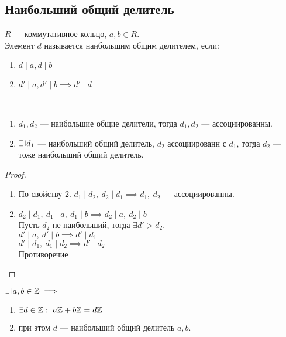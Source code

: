 \begin{normalsize}

\section{Наибольший общий делитель}

\begin{defn}
    $R$ --- коммутативное кольцо, $a, b \in R$.\\
    Элемент $d$ называется наибольшим общим делителем, если:\\
    \begin{enumerate}
        \item $d \mid a, d \mid b$
        \item $d' \mid a, d' \mid b \implies d' \mid d$
    \end{enumerate}
\end{defn}

\begin{theorem-non}~
    \begin{enumerate}
        \item $d_1, d_2$ --- наибольшие общие делители, тогда $d_1, d_2$ --- ассоциированны.
        \item $\letus d_1$ --- наибольший общий делитель, $d_2$ ассоциированн с $d_1$, тогда $d_2$ --- тоже наибольший общий делитель.
    \end{enumerate}
\end{theorem-non}

\begin{proof}
    \begin{enumerate}
        \item По свойству 2. $d_1 \mid d_2,~d_2 \mid d_1 \implies d_1,~d_2$ --- ассоциированны.
        \item $d_2 \mid d_1,~d_1 \mid a,~d_1 \mid b \implies d_2 \mid a,~d_2 \mid b$\\
        Пусть $d_2$ не наибольший, тогда $\exists d' > d_2$.\\
        $d' \mid a,~d' \mid b \implies d' \mid d_1$\\
        $d' \mid d_1,~d_1 \mid d_2 \implies d' \mid d_2$\\
        Противоречие
    \end{enumerate}
\end{proof}

\begin{theorem-non} 
    $\letus a, b \in \mathZ \implies$
    \begin{enumerate}
        \item $\exists d \in \mathbb{Z}:~a\mathbb{Z} + b\mathbb{Z} = d\mathbb{Z}$
        \item при этом $d$ --- наибольший общий делитель $a, b$.
    \end{enumerate}
\end{theorem-non}


\end{normalsize}
